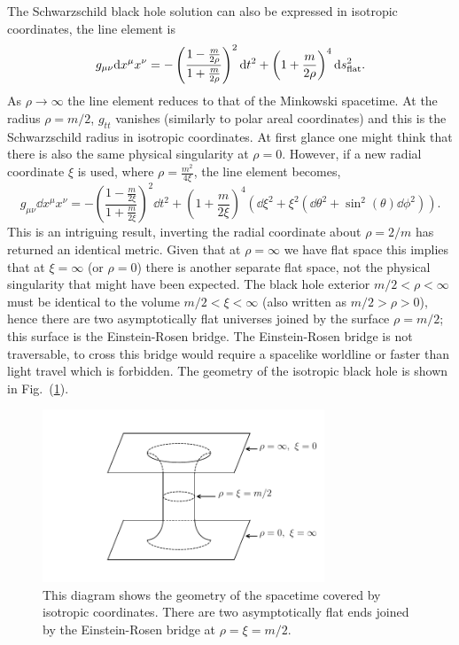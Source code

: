 The Schwarzschild black hole solution can also be expressed in isotropic coordinates, the line element is
\\[-5pt]\begin{align} \label{intro:eq:iso_bh} 
g_{\mu\nu} \dd x^\mu x^\nu = -\left(\frac{1-\frac{m}{2\rho}}{1+\frac{m}{2\rho}} \right)^2 \dd t^2 + \left(1+\frac{m}{2\rho} \right)^4 \dd s_{\rm flat}^2.
\end{align}
As $\rho \rightarrow \infty$ the line element reduces to that of the Minkowski spacetime. At the radius $\rho= m/2$, $g_{tt}$ vanishes (similarly to polar areal coordinates) and this is the Schwarzschild radius in isotropic coordinates. At first glance one might think that there is also the same physical singularity at $\rho=0$. However, if a new radial coordinate $\xi$ is used, where $\rho = \frac{m^2}{4\xi}$, the line element becomes, 
\begin{equation}
g_{\mu\nu} \dd x^\mu x^\nu = -\left(\frac{1-\frac{m}{2\xi}}{1+\frac{m}{2\xi}} \right)^2 \dd t^2 + \left(1+\frac{m}{2\xi} \right)^4 \left(\dd \xi^2 + \xi^2(\dd \theta^2 + \sin^2 (\theta) \dd \phi^2) \right).
\end{equation}
This is an intriguing result, inverting the radial coordinate about $\rho=2/m$ has returned an identical metric. Given that at $\rho=\infty$ we have flat space this implies that at $\xi=\infty$ (or $\rho=0$) there is another separate flat space, not the physical singularity that might have been expected. The black hole exterior $m/2<\rho<\infty$ must be identical to the volume $m/2<\xi<\infty$ (also written as $m/2>\rho>0$), hence there are two asymptotically flat universes joined by the surface $\rho=m/2$; this surface is the Einstein-Rosen bridge. The Einstein-Rosen bridge is not traversable, to cross this bridge would require a spacelike worldline or faster than light travel which is forbidden. The geometry of the isotropic black hole is shown in Fig.~(\ref{intro:fig:scbh_er}).

\begin{figure}[h!]
\centering
    \includegraphics[width=0.75\textwidth]{png/tuuube.pdf}
    \caption{This diagram shows the geometry of the spacetime covered by isotropic coordinates. There are two asymptotically flat ends joined by the Einstein-Rosen bridge at $\rho=\xi=m/2$.}
    \label{intro:fig:scbh_er}
\end{figure}

